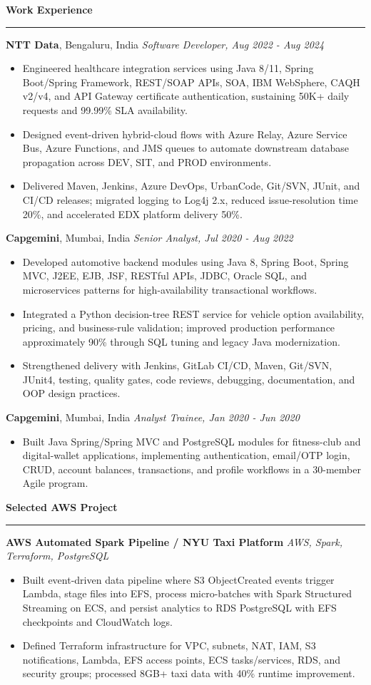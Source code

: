\documentclass[10pt,letterpaper]{article}
\newcommand{\ressection}[1]{\vspace{2.3pt}\par\textbf{#1}\par\vspace{0.7pt}\hrule\vspace{1.3pt}}
\begin{document}
\ressection{Work Experience}
\textbf{NTT Data}, Bengaluru, India \hfill \textit{Software Developer, Aug 2022 - Aug 2024}
\begin{itemize}
  \item Engineered healthcare integration services using Java 8/11, Spring Boot/Spring Framework, REST/SOAP APIs, SOA, IBM WebSphere, CAQH v2/v4, and API Gateway certificate authentication, sustaining 50K+ daily requests and 99.99\% SLA availability.
  \item Designed event-driven hybrid-cloud flows with Azure Relay, Azure Service Bus, Azure Functions, and JMS queues to automate downstream database propagation across DEV, SIT, and PROD environments.
  \item Delivered Maven, Jenkins, Azure DevOps, UrbanCode, Git/SVN, JUnit, and CI/CD releases; migrated logging to Log4j 2.x, reduced issue-resolution time 20\%, and accelerated EDX platform delivery 50\%.
\end{itemize}
\textbf{Capgemini}, Mumbai, India \hfill \textit{Senior Analyst, Jul 2020 - Aug 2022}
\begin{itemize}
  \item Developed automotive backend modules using Java 8, Spring Boot, Spring MVC, J2EE, EJB, JSF, RESTful APIs, JDBC, Oracle SQL, and microservices patterns for high-availability transactional workflows.
  \item Integrated a Python decision-tree REST service for vehicle option availability, pricing, and business-rule validation; improved production performance approximately 90\% through SQL tuning and legacy Java modernization.
  \item Strengthened delivery with Jenkins, GitLab CI/CD, Maven, Git/SVN, JUnit4, testing, quality gates, code reviews, debugging, documentation, and OOP design practices.
\end{itemize}
\textbf{Capgemini}, Mumbai, India \hfill \textit{Analyst Trainee, Jan 2020 - Jun 2020}
\begin{itemize}
  \item Built Java Spring/Spring MVC and PostgreSQL modules for fitness-club and digital-wallet applications, implementing authentication, email/OTP login, CRUD, account balances, transactions, and profile workflows in a 30-member Agile program.
\end{itemize}

\ressection{Selected AWS Project}
\textbf{AWS Automated Spark Pipeline / NYU Taxi Platform} \hfill \textit{AWS, Spark, Terraform, PostgreSQL}
\begin{itemize}
  \item Built event-driven data pipeline where S3 ObjectCreated events trigger Lambda, stage files into EFS, process micro-batches with Spark Structured Streaming on ECS, and persist analytics to RDS PostgreSQL with EFS checkpoints and CloudWatch logs.
  \item Defined Terraform infrastructure for VPC, subnets, NAT, IAM, S3 notifications, Lambda, EFS access points, ECS tasks/services, RDS, and security groups; processed 8GB+ taxi data with 40\% runtime improvement.
\end{itemize}
\end{document}
